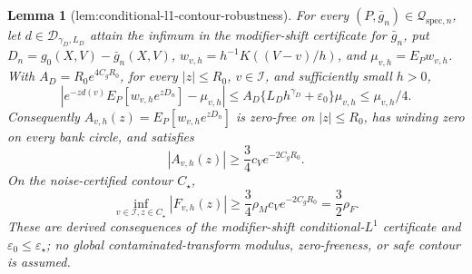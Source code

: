 \documentclass{article}
\newtheorem{lemma}{Lemma}
\begin{document}
\begin{lemma}[lem:conditional-l1-contour-robustness]\label{lem:conditional-l1-contour-robustness}
For every \((P,\bar g_n)\in\mathcal Q_{\mathrm{spec},n}\), let \(d\in\mathcal D_{\gamma_D,L_D}\) attain the infimum in the modifier-shift certificate for \(\bar g_n\), put \(D_n=g_0(X,V)-\bar g_n(X,V)\), \(w_{v,h}=h^{-1}K((V-v)/h)\), and \(\mu_{v,h}=E_Pw_{v,h}\). With \(A_D=R_0e^{4C_gR_0}\), for every \(|z|\le R_0\), \(v\in\mathcal I\), and sufficiently small \(h>0\),
\[
 \left|e^{-zd(v)}E_P[w_{v,h}e^{zD_n}]-\mu_{v,h}\right|
 \le A_D\{L_Dh^{\gamma_D}+\varepsilon_0\}\mu_{v,h}
 \le\mu_{v,h}/4.
\]
Consequently \(A_{v,h}(z)=E_P[w_{v,h}e^{zD_n}]\) is zero-free on \(|z|\le R_0\), has winding zero on every bank circle, and satisfies
\[
 |A_{v,h}(z)|\ge\frac34c_Ve^{-2C_gR_0}.
\]
On the noise-certified contour \(C_\star\),
\[
 \inf_{v\in\mathcal I,z\in C_\star}|F_{v,h}(z)|
 \ge\frac34\rho_Mc_Ve^{-2C_gR_0}=\frac32\rho_F.
\]
These are derived consequences of the modifier-shift conditional-\(L^1\) certificate and \(\varepsilon_0\le\varepsilon_\star\); no global contaminated-transform modulus, zero-freeness, or safe contour is assumed.
\end{lemma}
\end{document}
